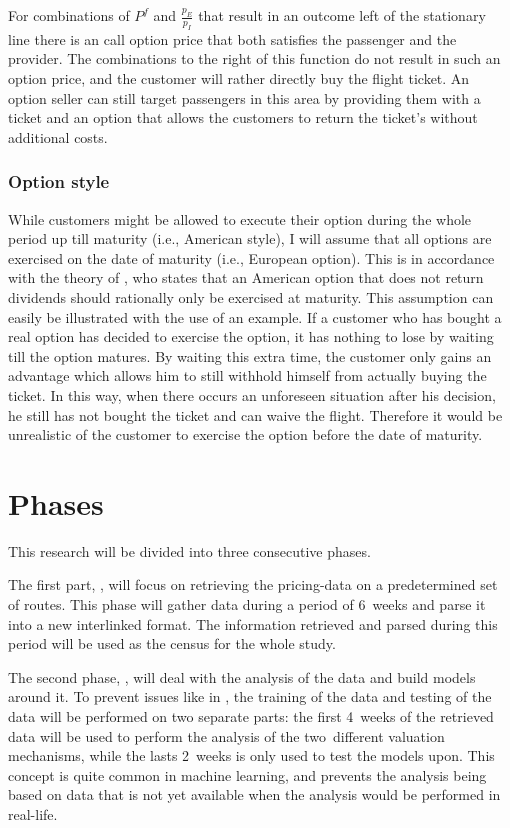 For combinations of $P^f$ and $\frac{p_E}{p_I}$ that result in an outcome left of the stationary line there is an call option price that both satisfies the passenger and the provider. The combinations to the right of this function do not result in such an option price, and the customer will rather directly buy the flight ticket. An option seller can still target passengers in this area by providing them with a ticket and an option that allows the customers to return the ticket's without additional costs.

\subsubsection{Option style}
\label{sec:OptionStyle}
While customers might be allowed to execute their option during the whole period up till maturity (i.e., American style), I will assume that all options are exercised on the date of maturity (i.e., European option). This is in accordance with the theory of , who states that an American option that does not return dividends should rationally only be exercised at maturity. This assumption can easily be illustrated with the use of an example. If a customer who has bought a real option has decided to exercise the option, it has nothing to lose by waiting till the option matures. By waiting this extra time, the customer only gains an advantage which allows him to still withhold himself from actually buying the ticket. In this way, when there occurs an unforeseen situation after his decision, he still has not bought the ticket and can waive the flight. Therefore it would be unrealistic of the customer to exercise the option before the date of maturity.



\section{Phases}
This research will be divided into three consecutive phases.

The first part, , will focus on retrieving the pricing-data on a predetermined set of routes. This phase will gather data during a period of 6~weeks and parse it into a new interlinked format. The information retrieved and parsed during this period will be used as the census for the whole study.

The second phase, , will deal with the analysis of the data and build models around it. To prevent issues like in , the training of the data and testing of the data will be performed on two separate parts: the first 4~weeks of the retrieved data will be used to perform the analysis of the two~different valuation mechanisms, while the lasts 2~weeks is only used to test the models upon. This concept is quite common in machine learning, and prevents the analysis being based on data that is not yet available when the analysis would be performed in real-life.

